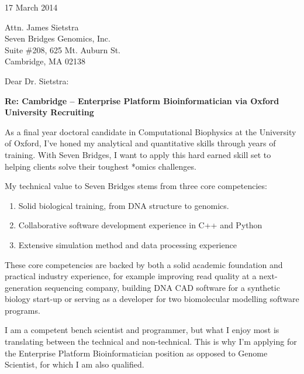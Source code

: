 \documentclass{../res}
\begin{document}
 
\begin{sloppypar}
 
%


\begin{resume} 
 
17 March 2014

Attn. James Sietstra \\
Seven Bridges Genomics, Inc. \\
Suite \#208, 625 Mt. Auburn St.  \\
Cambridge, MA 02138

Dear Dr. Sietstra:

\textbf{Re: Cambridge -- Enterprise Platform Bioinformatician via Oxford University Recruiting}

As a final year doctoral candidate in Computational Biophysics at the University of Oxford, I've honed my analytical and quantitative skills through years of training. With Seven Bridges, I want to apply this hard earned skill set to helping clients solve their toughest *omics challenges. 

My technical value to Seven Bridges stems from three core competencies: 
\begin{enumerate}[itemindent=1cm]
    \item Solid biological training, from DNA structure to genomics.
    \item Collaborative software development experience in C++ and Python
    \item Extensive simulation method and data processing experience
\end{enumerate}

These core competencies are backed by both a solid academic foundation and practical industry experience, for example improving read quality at a next-generation sequencing company, building DNA CAD software for a synthetic biology start-up or serving as a developer for two biomolecular modelling software programs.

I am a competent bench scientist and programmer, but what I enjoy most is translating between the technical and non-technical. This is why I'm applying for the Enterprise Platform Bioinformatician position as opposed to Genome Scientist, for which I am also qualified.


\end{resume}
\end{sloppypar}
\end{document}
